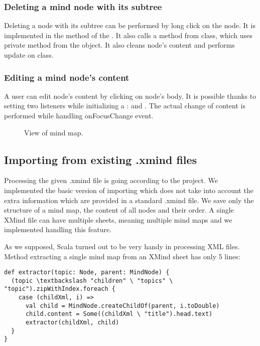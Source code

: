 \subsubsection{Deleting a mind node with its subtree}
\label{subsubsec:delete-node}
 Deleting a node with its subtree can be performed by long click on the node. It is implemented in the  method of the . It also calls a  method from  class, which uses  private method from the  object. It also cleans node's content and performs update on  class. 
 
\subsubsection{Editing a mind node's content}
\label{subsubsec:delete-node}
A user can edit node's content by clicking on node's body. It is possible thanks to setting two listeners while initializing a :  and . The actual change of content is performed while handling onFocusChange event.

\begin{figure}[h]
	\centering
	\caption{View of mind map.}
	\label{fig:screen-map}
\end{figure}

\subsection{Importing from existing .xmind files}
\label{subsec:import}
Processing the given .xmind file is going according to the project. We implemented the basic version of importing which does not take into account the extra information which are provided in a standard .xmind file. We save only the structure of a mind map, the content of all nodes and their order. A single XMind file can have multiple sheets, meaning multiple mind maps and we implemented handling this feature. 

As we supposed, Scala turned out to be very handy in processing XML files. Method extracting a single mind map from an XMind sheet has only 5 lines: 
\begin{verbatim}
def extractor(topic: Node, parent: MindNode) {
  (topic \textbackslash "children" \ "topics" \ "topic").zipWithIndex.foreach {
    case (childXml, i) =>
      val child = MindNode.createChildOf(parent, i.toDouble)
      child.content = Some((childXml \ "title").head.text)
      extractor(childXml, child)
  }
}\end{verbatim}

